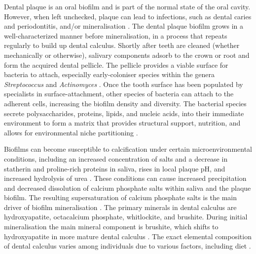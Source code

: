 \documentclass[10pt,a4paper]{article}
\begin{document}
Dental plaque is an oral biofilm and is part of the normal state of the
oral cavity. However, when left unchecked, plaque can lead to
infections, such as dental caries and periodontitis, and/or
mineralisation \citep{marshDentalPlaque2006}. The dental plaque biofilm
grows in a well-characterized manner before mineralisation, in a process
that repeats regularly to build up dental calculus. Shortly after teeth
are cleaned (whether mechanically or otherwise), salivary components
adsorb to the crown or root and form the acquired dental pellicle. The
pellicle provides a viable surface for bacteria to attach, especially
early-coloniser species within the genera \emph{Streptococcus} and
\emph{Actinomyces} \citep{marshDentalPlaque2006}. Once the tooth surface
has been populated by specialists in surface-attachment, other species
of bacteria can attach to the adherent cells, increasing the biofilm
density and diversity. The bacterial species secrete polysaccharides,
proteins, lipids, and nucleic acids, into their immediate environment to
form a matrix that provides structural support, nutrition, and allows
for environmental niche partitioning
\citep{flemmingBiofilmsEmergent2016}.

Biofilms can become susceptible to calcification under certain
microenvironmental conditions, including an increased concentration of
salts and a decrease in statherin and proline-rich proteins in saliva,
rises in local plaque pH, and increased hydrolysis of urea
\citep{whiteDentalCalculus1997, wongCalciumPhosphate2002}. These
conditions can cause increased precipitation and decreased dissolution
of calcium phosphate salts within saliva and the plaque biofilm. The
resulting supersaturation of calcium phosphate salts is the main driver
of biofilm mineralisation \citep{jinSupragingivalCalculus2002}. The
primary minerals in dental calculus are hydroxyapatite, octacalcium
phosphate, whitlockite, and brushite. During initial mineralisation the
main mineral component is brushite, which shifts to hydroxyapatite in
more mature dental calculus
\citep{jinSupragingivalCalculus2002, hayashizakiSiteSpecific2008}. The
exact elemental composition of dental calculus varies among individuals
due to various factors, including diet
\citep{hayashizakiSiteSpecific2008, jiFluorideMagnesium2000}.
\end{document}

